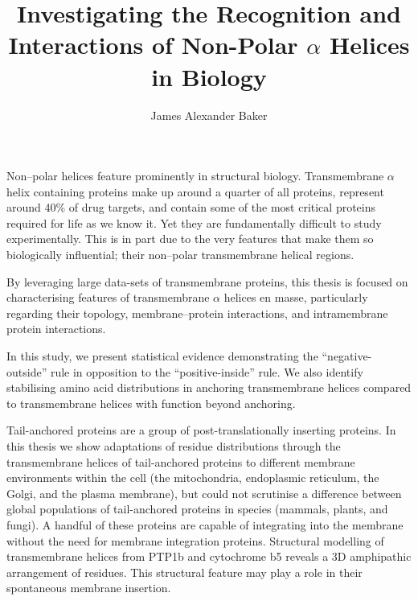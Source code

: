 \documentclass[12pt,PhD,twoside]{muthesis}
\begin{document}
\sloppy

\title{Investigating the Recognition and Interactions of Non-Polar \(\alpha\) Helices in Biology}
\author{James Alexander Baker}
\def\wordcount{63,689}






\beforeabstract{} %


Non\---polar helices feature prominently in structural biology.
Transmembrane \(\alpha\) helix containing proteins make up around a quarter of all proteins, represent around 40\% of drug targets, and contain some of the most critical proteins required for life as we know it.
Yet they are fundamentally difficult to study experimentally.
This is in part due to the very features that make them so biologically influential; their non\---polar transmembrane helical regions.

By leveraging large data-sets of transmembrane proteins, this thesis is focused on characterising features of transmembrane \(\alpha\) helices en masse, particularly regarding their topology, membrane\---protein interactions, and intramembrane protein interactions.

In this study, we present statistical evidence demonstrating the ``negative\--outside'' rule in opposition to the ``positive\--inside'' rule.
We also identify stabilising amino acid distributions in anchoring transmembrane helices compared to transmembrane helices with function beyond anchoring.

Tail\--anchored proteins are a group of post\--translationally inserting proteins.
In this thesis we show adaptations of residue distributions through the transmembrane helices of tail\--anchored proteins to different membrane environments within the cell (the mitochondria, endoplasmic reticulum, the Golgi, and the plasma membrane), but could not scrutinise a difference between global populations of tail\--anchored proteins in species (mammals, plants, and fungi).
A handful of these proteins are capable of integrating into the membrane without the need for membrane integration proteins.
Structural modelling of transmembrane helices from PTP1b and cytochrome b5 reveals a 3D amphipathic arrangement of residues.
This structural feature may play a role in their spontaneous membrane insertion.
\end{document}
